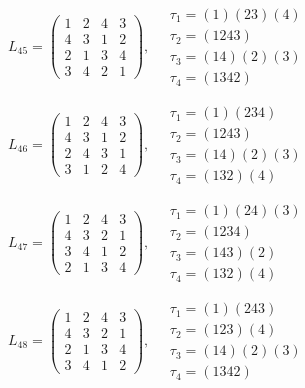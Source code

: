 $L_{45} = \begin{pmatrix} 1 & 2 & 4 & 3 \\ 4 & 3 & 1 & 2 \\ 2 & 1 & 3 & 4 \\ 3 & 4 & 2 & 1 \end{pmatrix}, \quad \begin{matrix} \tau_{1} = (1)(2 3)(4) \\ \tau_{2} = (1 2 4 3) \\ \tau_{3} = (1 4)(2)(3) \\ \tau_{4} = (1 3 4 2) \end{matrix}$

$L_{46} = \begin{pmatrix} 1 & 2 & 4 & 3 \\ 4 & 3 & 1 & 2 \\ 2 & 4 & 3 & 1 \\ 3 & 1 & 2 & 4 \end{pmatrix}, \quad \begin{matrix} \tau_{1} = (1)(2 3 4) \\ \tau_{2} = (1 2 4 3) \\ \tau_{3} = (1 4)(2)(3) \\ \tau_{4} = (1 3 2)(4) \end{matrix}$

$L_{47} = \begin{pmatrix} 1 & 2 & 4 & 3 \\ 4 & 3 & 2 & 1 \\ 3 & 4 & 1 & 2 \\ 2 & 1 & 3 & 4 \end{pmatrix}, \quad \begin{matrix} \tau_{1} = (1)(2 4)(3) \\ \tau_{2} = (1 2 3 4) \\ \tau_{3} = (1 4 3)(2) \\ \tau_{4} = (1 3 2)(4) \end{matrix}$

$L_{48} = \begin{pmatrix} 1 & 2 & 4 & 3 \\ 4 & 3 & 2 & 1 \\ 2 & 1 & 3 & 4 \\ 3 & 4 & 1 & 2 \end{pmatrix}, \quad \begin{matrix} \tau_{1} = (1)(2 4 3) \\ \tau_{2} = (1 2 3)(4) \\ \tau_{3} = (1 4)(2)(3) \\ \tau_{4} = (1 3 4 2) \end{matrix}$

